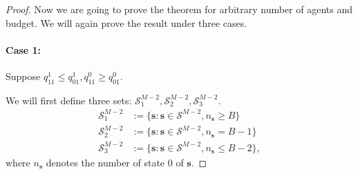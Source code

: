 \begin{proof}
Now we are going to prove the theorem for arbitrary number of agents and budget. We will again prove the result under three cases.

\paragraph{Case 1:} Suppose $q^1_{11}\leq q^1_{01},q^0_{11}\geq q^0_{01}$.

 We will first define three sets: $\mathcal{S}^{M-2}_1,\mathcal{S}^{M-2}_2,\mathcal{S}^{M-2}_3$. 
\begin{align*}
    \mathcal{S}^{M-2}_1&:=\{\bm{s}:\bm{s}\in\mathcal{S}^{M-2}, n_{\bm{s}}\geq B\}\\
    \mathcal{S}^{M-2}_2&:=\{\bm{s}:\bm{s}\in\mathcal{S}^{M-2}, n_{\bm{s}}= B-1\}\\
    \mathcal{S}^{M-2}_3&:=\{\bm{s}:\bm{s}\in\mathcal{S}^{M-2}, n_{\bm{s}}\leq B-2\},
\end{align*}
where $n_{\bm{s}}$ denotes the number of state $0$ of $\bm{s}$.


\end{proof}
